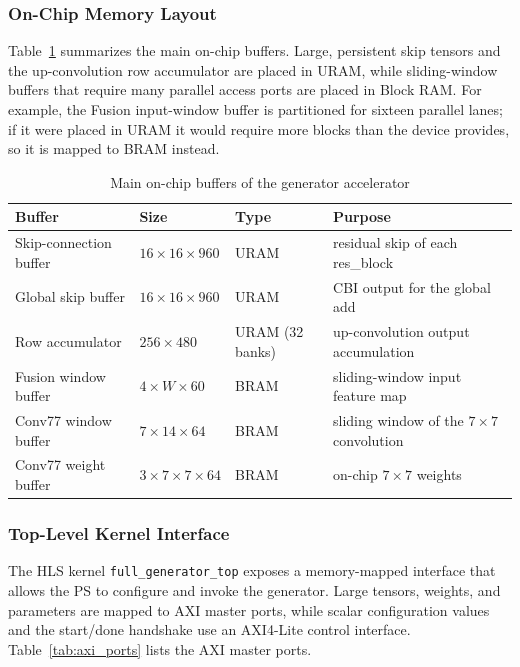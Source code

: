 \subsubsection{On-Chip Memory Layout}

Table~\ref{tab:onchip_buffers} summarizes the main on-chip buffers. Large, persistent skip tensors and the up-convolution row accumulator are placed in URAM, while sliding-window buffers that require many parallel access ports are placed in Block RAM. For example, the Fusion input-window buffer is partitioned for sixteen parallel lanes; if it were placed in URAM it would require more blocks than the device provides, so it is mapped to BRAM instead.

\begin{table}[H]
\centering
\caption{Main on-chip buffers of the generator accelerator}
\label{tab:onchip_buffers}
\begin{tabularx}{\textwidth}{|>{\raggedright\arraybackslash}p{}|>{\raggedright\arraybackslash}p{}|>{\raggedright\arraybackslash}p{}|X|}
\hline
\textbf{Buffer} & \textbf{Size} & \textbf{Type} & \textbf{Purpose} \\
\hline
Skip-connection buffer & $16\times16\times960$ & URAM & residual skip of each res\_block \\
\hline
Global skip buffer & $16\times16\times960$ & URAM & CBI output for the global add \\
\hline
Row accumulator & $256\times480$ & URAM (32 banks) & up-convolution output accumulation \\
\hline
Fusion window buffer & $4\times W\times60$ & BRAM & sliding-window input feature map \\
\hline
Conv77 window buffer & $7\times14\times64$ & BRAM & sliding window of the $7\times7$ convolution \\
\hline
Conv77 weight buffer & $3\times7\times7\times64$ & BRAM & on-chip $7\times7$ weights \\
\hline
\end{tabularx}
\end{table}

\subsubsection{Top-Level Kernel Interface}

The HLS kernel \texttt{full\_generator\_top} exposes a memory-mapped interface that allows the PS to configure and invoke the generator. Large tensors, weights, and parameters are mapped to AXI master ports, while scalar configuration values and the start/done handshake use an AXI4-Lite control interface. Table~\ref{tab:axi_ports} lists the AXI master ports.

